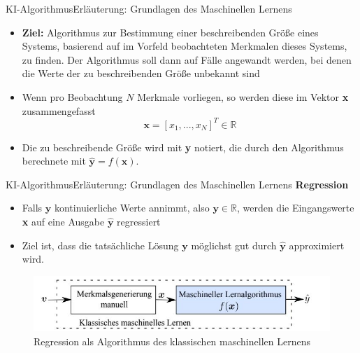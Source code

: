 \documentclass[169, handout	]{THIbeamer} %
\begin{document}
	\begin{frame}{KI-Algorithmus}{Erläuterung: Grundlagen des Maschinellen Lernens}
		\begin{itemize}
			\item \textbf{Ziel:} Algorithmus zur Bestimmung einer beschreibenden Größe eines Systems, basierend auf im Vorfeld beobachteten Merkmalen dieses Systems, zu finden. Der Algorithmus soll dann auf Fälle angewandt werden, bei denen die Werte der zu beschreibenden Größe unbekannt sind
			\item Wenn pro Beobachtung $N$ Merkmale vorliegen, so werden diese im Vektor \textbf{x} zusammengefasst
			\begin{equation}
				\textbf{x} = [x_1,..., x_{N}]^{T} \in \mathbb{R}
			\end{equation}
			\item Die zu beschreibende Größe wird mit \textbf{y} notiert, die durch den Algorithmus berechnete mit $\hat{\textbf{y}} = f(\textbf{x})$.
		\end{itemize}	
	\end{frame}
	\begin{frame}{KI-Algorithmus}{Erläuterung: Grundlagen des Maschinellen Lernens}
		\textbf{Regression}	
		\begin{itemize}
			\item Falls $\textbf{y}$ kontinuierliche Werte annimmt, also $\textbf{y} \in \mathbb{R}$, werden die Eingangswerte \textbf{x} auf eine Ausgabe $\hat{\textbf{y}}$ regressiert 
			\item Ziel ist, dass die tatsächliche Lösung $\textbf{y}$ möglichst gut durch $\hat{\textbf{y}} $ approximiert wird.
		\end{itemize}			
		\begin{figure}
			\includegraphics[scale=0.7]{required/Machine Learning.jpg}
			\caption{Regression als Algorithmus des klassischen maschinellen Lernens}
        	\label{Machine Learning}
		\end{figure}
	\end{frame}
\end{document}
